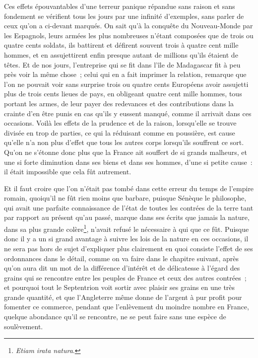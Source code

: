 \documentclass[french,twoside]{book} %
\begin{document}
Ces effets épouvantables d’une terreur panique répandue sans raison et sans fondement se vérifient tous les jours par une infinité d’exemples, sans parler de ceux qu’on a ci-devant marqués. On sait qu’à la conquête du Nouveau-Monde par les Espagnols, leurs armées les plus nombreuses n’étant composées que de trois ou quatre cents soldats, ils battirent et défirent souvent trois à quatre cent mille hommes, et en assujettirent enfin presque autant de millions qu’ils étaient de têtes. Et de nos jours, l’entreprise qui se fit dans l’île de Madagascar fit à peu près voir la même chose ; celui qui en a fait imprimer la relation, remarque que l’on ne pouvait voir sans surprise trois ou quatre cents Européens avoir assujetti plus de trois cents lieues de pays, en obligeant quatre cent mille hommes, tous portant les armes, de leur payer des redevances et des contributions dans la crainte d’en être punis en cas qu’ils y eussent manqué, comme il arrivait dans ces occasions. Voilà les effets de la prudence et de la raison, lorsqu’elle se trouve divisée en trop de parties, ce qui la réduisant comme en poussière, est cause qu’elle n’a non plus d’effet que tous les autres corps lorsqu’ils souffrent ce sort. Qu’on ne s’étonne donc plus que la France ait souffert de si grands malheurs, et une si forte diminution dans ses biens et dans ses hommes, d’une si petite cause : il était impossible que cela fût autrement.\par
Et il faut croire que l’on n’était pas tombé dans cette erreur du temps de l’empire romain, quoiqu’il ne fût rien moins que barbare, puisque Sénèque le philosophe, qui avait une parfaite connaissance de l’état de toutes les contrées de la terre tant par rapport au présent qu’au passé, marque dans ses écrits que jamais la nature, dans sa plus grande colère\footnote{{\itshape Etiam irata natura}.}, n’avait refusé le nécessaire à qui que ce fût. Puisque donc il y a un si grand avantage à suivre les lois de la nature en ces occasions, il ne sera pas hors de sujet d’expliquer plus clairement en quoi consiste l’effet de ses ordonnances dans le détail, comme on va faire dans le chapitre suivant, après qu’on aura dit un mot de la différence d’intérêt et de délicatesse à l’égard des grains qui se rencontre entre les peuples de France et ceux des autres contrées ; et pourquoi tout le Septentrion voit sortir avec plaisir ses grains en une très grande quantité, et que l’Angleterre même donne de l’argent à pur profit pour fomenter ce commerce, pendant que l’enlèvement du moindre nombre en France, quelque abondance qu’il se rencontre, ne se peut faire sans une espèce de soulèvement.\par
\end{document}
